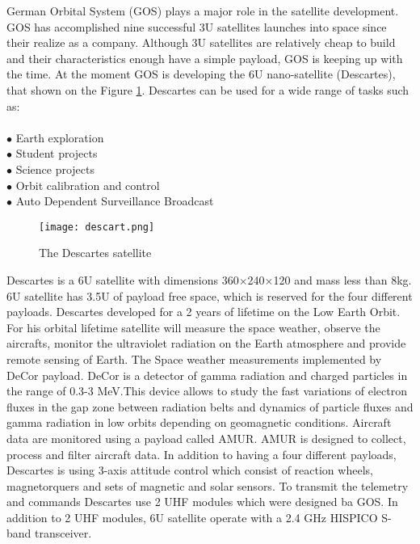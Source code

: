 German Orbital System (GOS) plays a major role in the satellite development. GOS has accomplished nine successful 3U satellites launches into space since their realize as a company. Although 3U satellites are relatively cheap to build and their characteristics enough have a simple payload, GOS is keeping up with the time. At the moment GOS is developing the 6U nano-satellite (Descartes), that shown on the Figure \ref{fig: EPS222}. Descartes can be used for a wide range of tasks such as:\\ \\
$\bullet$ Earth exploration\\ 
$\bullet$ Student projects\\ 
$\bullet$ Science projects\\ 
$\bullet$ Orbit calibration and control\\ 
$\bullet$ Auto Dependent Surveillance Broadcast\\ 



\begin{figure}[h]
	\centering
	\texttt{[image: descart.png]}
	\caption{The Descartes satellite}
	\label{fig: EPS222}
\end{figure}


  Descartes is a 6U satellite with dimensions 360$\times$240$\times$120 and mass less than 8kg. 6U satellite has 3.5U of payload free space, which is reserved for the four different payloads. Descartes developed for a 2 years of lifetime on the Low Earth Orbit. For his orbital lifetime satellite will measure the space weather, observe the aircrafts, monitor the ultraviolet radiation on the Earth atmosphere  and provide remote sensing of Earth. The Space weather measurements implemented by DeCor payload. DeCor is a detector of gamma radiation and charged particles in the range of 0.3-3 MeV.This device allows to study the fast variations of electron fluxes in the gap zone between radiation belts and dynamics of particle fluxes and gamma radiation in low orbits depending on geomagnetic conditions. Aircraft data are monitored using a payload called AMUR. AMUR is designed to collect, process and filter aircraft data. 
  In addition to having a four different payloads, Descartes is using 3-axis attitude control which consist of reaction wheels, magnetorquers and sets of magnetic and solar sensors. To transmit the telemetry and commands Descartes use 2 UHF modules which were designed ba GOS. In addition to 2 UHF modules, 6U satellite operate with a 2.4 GHz HISPICO S-band transceiver.\\ \\
 
